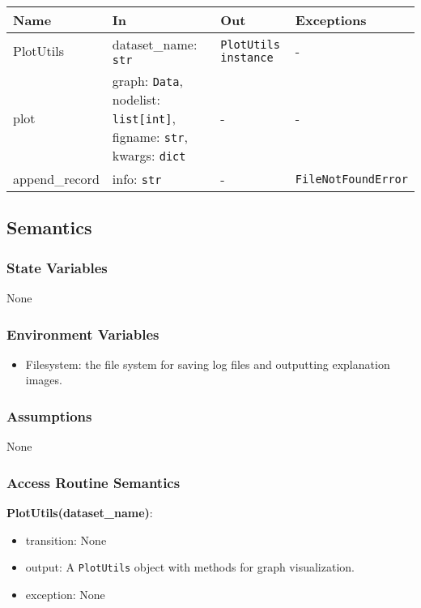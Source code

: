 \documentclass[12pt, titlepage]{article}
\begin{document}
\begin{center}
\begin{tabular}{p{3cm} p{5cm} p{4.5cm} p{3cm}}
\hline
\textbf{Name} & \textbf{In} & \textbf{Out} & \textbf{Exceptions} \\
\hline
PlotUtils & dataset\_name: \texttt{str} & \texttt{PlotUtils instance} & - \\
plot & graph: \texttt{Data}, nodelist: \texttt{list[int]}, figname: \texttt{str}, kwargs: \texttt{dict} & - & - \\
append\_record & info: \texttt{str} & - & \texttt{FileNotFoundError} \\
\hline
\end{tabular}
\end{center}

\subsection{Semantics}

\subsubsection{State Variables}
None

\subsubsection{Environment Variables}
\begin{itemize}
  \item Filesystem: the file system for saving log files and outputting explanation images.
\end{itemize}

\subsubsection{Assumptions}
None

\subsubsection{Access Routine Semantics}

\noindent \textbf{PlotUtils(dataset\_name)}:
\begin{itemize}
  \item transition: None
  \item output: A \texttt{PlotUtils} object with methods for graph visualization.
  \item exception: None
\end{itemize}
\end{document}
